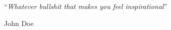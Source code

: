 \vspace*{0.2\textheight}

\noindent\enquote{\itshape Whatever bullshit that makes you feel 
inspirational}\bigbreak

\hfill John Doe